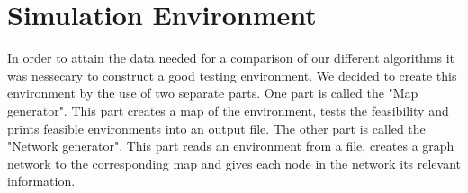 \chapter{Simulation Environment}
In order to attain the data needed for a comparison of our different algorithms it was nessecary to construct a good testing environment. We decided to create this environment by the use of two separate parts. One part is called the "Map generator". This part creates a map of the environment, tests the feasibility and prints feasible environments into an output file. The other part is called the "Network generator". This part reads an environment from a file, creates a graph network to the corresponding map and gives each node in the network its relevant information.\\
